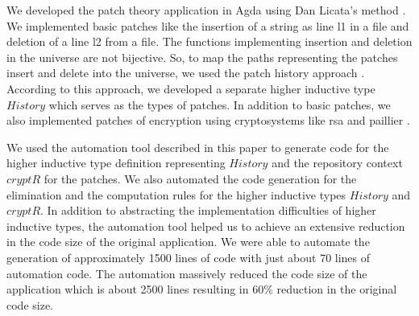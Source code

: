 \documentclass[sigplan,10pt]{acmart}
\begin{document}
We developed the patch theory application in Agda using Dan Licata's method \cite{Licata-2011}. We implemented basic patches like the insertion of a string as line l1 in a file and deletion of a line l2 from a file. The functions implementing insertion and deletion in the universe are not bijective. So, to map the paths representing the patches insert and delete into the universe, we used the patch history approach \cite{Angiuli-2014}. According to this approach, we developed a separate higher inductive type $History$ which serves as the types of patches. In addition to basic patches, we also implemented patches of encryption using cryptosystems like rsa \cite{Rivest-1978} and paillier \cite{Paillier-1999}.

We used the automation tool described in this paper to generate code for the higher inductive type definition representing $History$ and the repository context $cryptR$ for the patches. We also automated the code generation for the elimination and the computation rules for the higher inductive types $History$ and $cryptR$. In addition to abstracting the implementation difficulties of higher inductive types, the automation tool helped us to achieve an extensive reduction in the code size of the original application. We were able to automate the generation of approximately 1500 lines of code with just about 70 lines of automation code. The automation massively reduced the code size of the application which is about 2500 lines resulting in 60\% reduction in the original code size.


 
\end{document}
